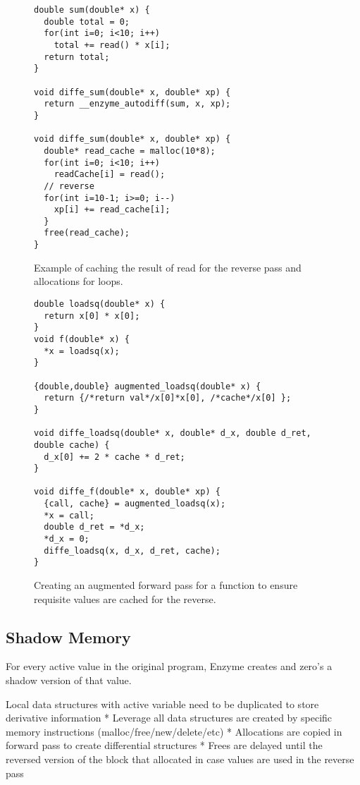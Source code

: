 \begin{figure}
\centering
\begin{verbatim}
double sum(double* x) {
  double total = 0;
  for(int i=0; i<10; i++)
    total += read() * x[i];
  return total;
}

void diffe_sum(double* x, double* xp) {
  return __enzyme_autodiff(sum, x, xp);
}

void diffe_sum(double* x, double* xp) {
  double* read_cache = malloc(10*8);
  for(int i=0; i<10; i++)
    readCache[i] = read();
  // reverse
  for(int i=10-1; i>=0; i--)
    xp[i] += read_cache[i];
  }
  free(read_cache);
}
\end{verbatim}
\caption{Example of caching the result of read for the reverse pass and allocations for loops.}
\label{fig:cacheloop}
\end{figure}

\begin{figure}
\begin{verbatim}
double loadsq(double* x) {
  return x[0] * x[0];
}
void f(double* x) {
  *x = loadsq(x);
}

{double,double} augmented_loadsq(double* x) {
  return {/*return val*/x[0]*x[0], /*cache*/x[0] };
}

void diffe_loadsq(double* x, double* d_x, double d_ret, double cache) {
  d_x[0] += 2 * cache * d_ret;
}

void diffe_f(double* x, double* xp) {
  {call, cache} = augmented_loadsq(x);
  *x = call;
  double d_ret = *d_x;
  *d_x = 0;
  diffe_loadsq(x, d_x, d_ret, cache);
}
\end{verbatim}
\caption{Creating an augmented forward pass for a function to ensure requisite values are cached for the reverse.}
\label{fig:cacheaugment}
\end{figure}

\subsection{Shadow Memory}
For every active value in the original program, Enzyme creates and zero's a shadow version of that value. 

Local data structures with active variable need to be
duplicated to store derivative information
* Leverage all data structures are created by specific
memory instructions (malloc/free/new/delete/etc)
* Allocations are copied in forward pass to create
differential structures
* Frees are delayed until the reversed version of the
block that allocated in case values are used in the
reverse pass

